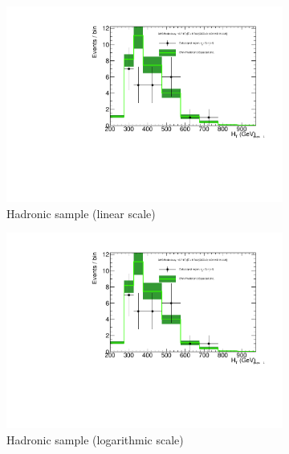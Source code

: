 \clearpage
\begin{figure}[h!]
  \centering
  \begin{subfigure}[b]{0.48\textwidth}
    \includegraphics[width=\textwidth,page=1]
    {Figs/results/v0/greenBand/bestFit_2012dev_RQcdZero_fZinvAll_3b_ge4j-1_smOnly}
    \caption{Hadronic sample (linear scale)}
  \end{subfigure}
  \begin{subfigure}[b]{0.48\textwidth}
    \includegraphics[width=\textwidth,page=2]
    {Figs/results/v0/greenBand/bestFit_2012dev_RQcdZero_fZinvAll_3b_ge4j-1_smOnly}
    \caption{Hadronic sample (logarithmic scale)}
  \end{subfigure}
  \begin{subfigure}[b]{0.48\textwidth}

\end{subfigure}
\end{figure}
